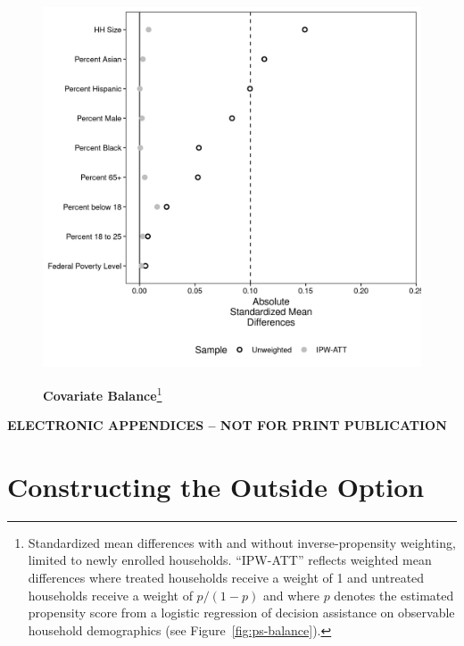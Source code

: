 \documentclass[12pt]{article}
\begin{document}
\newpage
\begin{figure}[htb]
\centering
\footnotesize
\begin{minipage}[h]{6in}
\caption[caption]{\textbf{Covariate Balance}\footnote{Standardized mean differences with and without inverse-propensity weighting, limited to newly enrolled households. ``IPW-ATT'' reflects weighted mean differences where treated households receive a weight of 1 and untreated households receive a weight of $p/(1-p)$ and where $p$ denotes the estimated propensity score from a logistic regression of decision assistance on observable household demographics (see Figure~\ref{fig:ps-balance}).}}
\centerline{%
    \includegraphics[scale=0.75]{figures/cov_balance.png}
}
\label{fig:cov-balance}
\end{minipage}
\end{figure}


\clearpage
\vspace{30pt}
{\centering \textbf{ELECTRONIC APPENDICES -- NOT FOR PRINT PUBLICATION}}
\appendix
\setcounter{table}{0}
\setcounter{figure}{0}
\renewcommand{\thetable}{A\arabic{table}}
\renewcommand{\thefigure}{A\arabic{figure}}

\section{Constructing the Outside Option}\label{outside_option}
\end{document}
